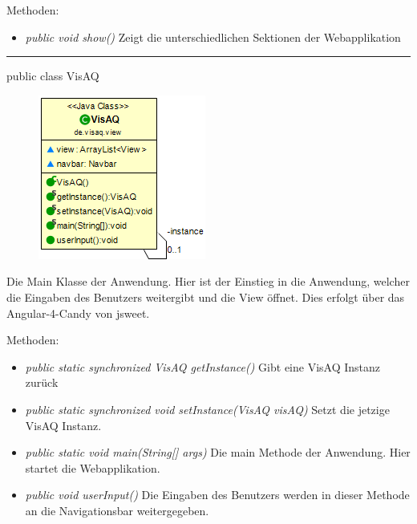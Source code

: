 Methoden:
\begin{itemize} 
    \item \emph{public void show()} Zeigt die unterschiedlichen Sektionen der Webapplikation
\end{itemize}

\rule{\textwidth}{0.4pt} 
public class VisAQ

\begin{minipage}{0.3\textwidth}
    \begin{figure}[H]
        \includegraphics[scale = 0.5]{media/frontend/view/de.view/VisAQ_Class.png}
    \end{figure}
    \end{minipage} \hfill
    \begin{minipage}{0.6\textwidth}
Die Main Klasse der Anwendung. Hier ist der Einstieg in die Anwendung, welcher die Eingaben des Benutzers weitergibt und die View öffnet. Dies erfolgt über das \gls{Angular-4-Candy} von jsweet.
\end{minipage}

Methoden:
\begin{itemize} 
    \item \emph{public static synchronized VisAQ getInstance()} Gibt eine VisAQ Instanz zurück
    \item \emph{public static synchronized void setInstance(VisAQ visAQ)} Setzt die jetzige VisAQ Instanz.
    \item \emph{public static void main(String[] args)} Die main Methode der Anwendung. Hier startet die Webapplikation.
    \item \emph{public void userInput()} Die Eingaben des Benutzers werden in dieser Methode an die Navigationsbar weitergegeben.
\end{itemize} 